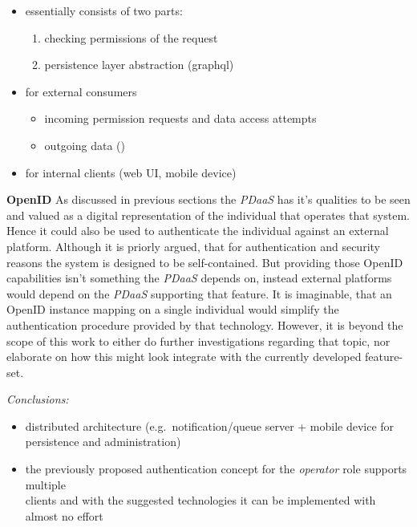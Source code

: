 \documentclass[12pt,english,a4paper,titlepage,cleardoublepage=empty,dottedtoc]{report}
\providecommand{\tightlist}{%
  \setlength{\itemsep}{0pt}\setlength{\parskip}{0pt}}
\begin{document}
\begin{itemize}
\tightlist
\item
  essentially consists of two parts:

  \begin{enumerate}
  \def\labelenumi{\arabic{enumi})}
  \tightlist
  \item
    checking permissions of the request
  \item
    persistence layer abstraction (graphql)
  \end{enumerate}
\item
  for external consumers

  \begin{itemize}
  \tightlist
  \item
    incoming permission requests and data access attempts
  \item
    outgoing data ()
  \end{itemize}
\item
  for internal clients (web UI, mobile device)
\end{itemize}

\textbf{OpenID} As discussed in previous sections the \emph{PDaaS} has
it's qualities to be seen and valued as a digital representation of the
individual that operates that system. Hence it could also be used to
authenticate the individual against an external platform. Although it is
priorly argued, that for authentication and security reasons the system
is designed to be self-contained. But providing those OpenID
capabilities isn't something the \emph{PDaaS} depends on, instead
external platforms would depend on the \emph{PDaaS} supporting that
feature. It is imaginable, that an OpenID instance mapping on a single
individual would simplify the authentication procedure provided by that
technology. However, it is beyond the scope of this work to either do
further investigations regarding that topic, nor elaborate on how this
might look integrate with the currently developed feature-set.

\emph{Conclusions:}

\begin{itemize}
\tightlist
\item
  distributed architecture (e.g.~notification/queue server + mobile
  device for persistence and administration)
\item
  the previously proposed authentication concept for the \emph{operator}
  role supports multiple\\
  clients and with the suggested technologies it can be implemented with
  almost no effort
\end{itemize}
\end{document}
